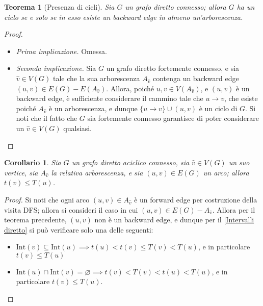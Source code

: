 \documentclass[14pt]{extreport}
\newtheorem{theorem}{Teorema}[subsection]
\newtheorem{corollary}{Corollario}[subsection]
\theoremstyle{definition}
\theoremstyle{definition}
\begin{document}
\begin{theorem}[Presenza di cicli]
    \label{Cicli diretto}
    Sia $G$ un grafo diretto connesso; allora $G$ ha un ciclo se e solo se in esso esiste un backward edge in almeno un'arborescenza.
\end{theorem}

\begin{proof}
    \hspace{0.7cm}
    \begin{itemize}
        \item[] \textit{Prima implicazione.} Omessa.
        \item[] \textit{Seconda implicazione.} Sia $G$ un grafo diretto fortemente connesso, e sia $\hat v \in V(G)$ tale che la sua arborescenza $A_{\hat v}$ contenga un backward edge $(u, v) \in E(G) - E(A_{\hat v})$. Allora, poiché $u, v \in V(A_{\hat v})$, e $(u, v)$ è un backward edge, è sufficiente considerare il cammino tale che $u \rightarrow v$, che esiste poiché $A_{\hat v}$ è un arborescenza, e dunque $\{u \rightarrow v\} \cup (u, v)$ è un ciclo di $G$. Si noti che il fatto che $G$ sia fortemente connesso garantisce di poter considerare un $\hat v \in V(G)$ qualsiasi.
    \end{itemize}
\end{proof}

\begin{corollary}
    Sia $G$ un grafo diretto aciclico connesso, sia $\hat v \in V(G)$ un suo vertice, sia $A_{\hat v}$ la relativa arborescenza, e sia $(u, v) \in E(G)$ un arco; allora $t(v) \le T(u)$.
\end{corollary}

\begin{proof}
    Si noti che ogni arco $(u, v) \in A_{\hat v}$ è un forward edge per costruzione della visita DFS; allora si consideri il caso in cui $(u, v) \in E(G) - A_{\hat v}$. Allora per il teorema precedente, $(u, v)$ non è un backward edge, e dunque per il \cref{Intervalli diretto} si può verificare solo una delle seguenti:
    \begin{itemize}
        \item $\mathrm{Int}(v) \subseteq \mathrm{Int}(u) \implies t(u) < t(v) \le T(v) < T(u)$, e in particolare $t(v) \le T(u)$
        \item $\mathrm{Int}(u) \cap \mathrm{Int}(v) = \varnothing \implies t(v) < T(v) < t(u) < T(u)$, e in particolare $t(v) \le T(u)$.
    \end{itemize}
\end{proof}
\end{document}
